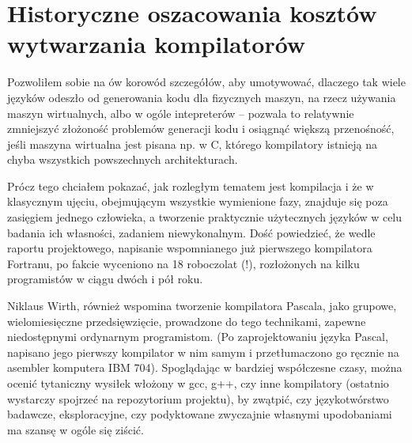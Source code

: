 \section{Historyczne oszacowania kosztów wytwarzania kompilatorów}
Pozwoliłem sobie na ów korowód szczegółów, aby umotywować, dlaczego tak wiele języków odeszło od generowania kodu dla fizycznych maszyn, na rzecz używania maszyn wirtualnych, albo w ogóle intepreterów – pozwala to relatywnie zmniejszyć złożoność problemów generacji kodu i osiągnąć większą przenośność, jeśli maszyna wirtualna jest pisana np. w C, którego kompilatory istnieją na chyba wszystkich powszechnych architekturach.

Prócz tego chciałem pokazać, jak rozległym tematem jest kompilacja i że w klasycznym ujęciu, obejmującym wszystkie wymienione fazy, znajduje się poza zasięgiem jednego człowieka, a tworzenie praktycznie użytecznych języków w celu badania ich własności, zadaniem niewykonalnym. Dość powiedzieć, że wedle raportu projektowego, napisanie wspomnianego już pierwszego kompilatora Fortranu, po fakcie wyceniono na 18 roboczolat (!), rozłożonych na kilku programistów w ciągu dwóch i pół roku.\cite{FORTRAN_AUTOMATIC_CODING_SYSTEM}

Niklaus Wirth, również wspomina tworzenie kompilatora Pascala, jako grupowe, wielomiesięczne przedsięwzięcie, prowadzone do tego technikami, zapewne niedostępnymi ordynarnym programistom. (Po zaprojektowaniu języka Pascal, napisano jego pierwszy kompilator w nim samym i przetłumaczono go ręcznie na asembler komputera IBM 704).\cite{Wirth_recollections_Pascal} Spoglądając w bardziej współczesne czasy, można ocenić tytaniczny wysiłek włożony w gcc, g++, czy inne kompilatory (ostatnio wystarczy spojrzeć na repozytorium projektu), by zwątpić, czy językotwórstwo badawcze, eksploracyjne, czy podyktowane zwyczajnie własnymi upodobaniami ma szansę w ogóle się ziścić.



